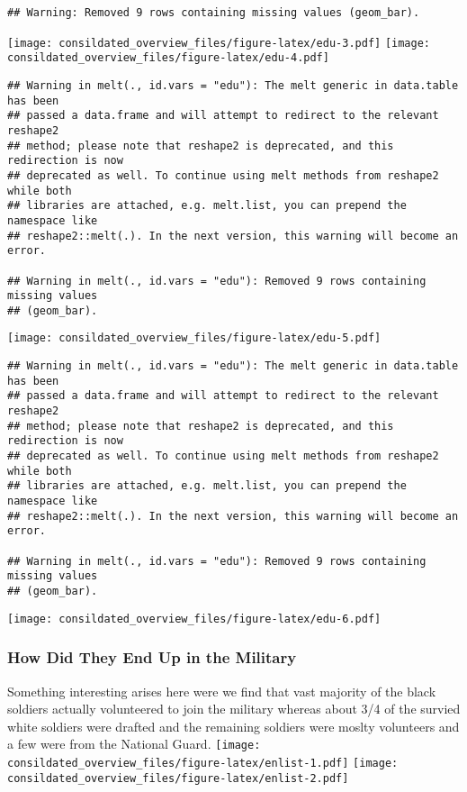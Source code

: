 \documentclass[]{article}
\begin{document}
\begin{verbatim}
## Warning: Removed 9 rows containing missing values (geom_bar).
\end{verbatim}

\texttt{[image: consildated\_overview\_files/figure-latex/edu-3.pdf]}
\texttt{[image: consildated\_overview\_files/figure-latex/edu-4.pdf]}

\begin{verbatim}
## Warning in melt(., id.vars = "edu"): The melt generic in data.table has been
## passed a data.frame and will attempt to redirect to the relevant reshape2
## method; please note that reshape2 is deprecated, and this redirection is now
## deprecated as well. To continue using melt methods from reshape2 while both
## libraries are attached, e.g. melt.list, you can prepend the namespace like
## reshape2::melt(.). In the next version, this warning will become an error.

## Warning in melt(., id.vars = "edu"): Removed 9 rows containing missing values
## (geom_bar).
\end{verbatim}

\texttt{[image: consildated\_overview\_files/figure-latex/edu-5.pdf]}

\begin{verbatim}
## Warning in melt(., id.vars = "edu"): The melt generic in data.table has been
## passed a data.frame and will attempt to redirect to the relevant reshape2
## method; please note that reshape2 is deprecated, and this redirection is now
## deprecated as well. To continue using melt methods from reshape2 while both
## libraries are attached, e.g. melt.list, you can prepend the namespace like
## reshape2::melt(.). In the next version, this warning will become an error.

## Warning in melt(., id.vars = "edu"): Removed 9 rows containing missing values
## (geom_bar).
\end{verbatim}

\texttt{[image: consildated\_overview\_files/figure-latex/edu-6.pdf]}

\subsubsection{How Did They End Up in the
Military}\label{how-did-they-end-up-in-the-military}

Something interesting arises here were we find that vast majority of the
black soldiers actually volunteered to join the military whereas about
3/4 of the survied white soldiers were drafted and the remaining
soldiers were moslty volunteers and a few were from the National Guard.
\texttt{[image: consildated\_overview\_files/figure-latex/enlist-1.pdf]}
\texttt{[image: consildated\_overview\_files/figure-latex/enlist-2.pdf]}
\end{document}
